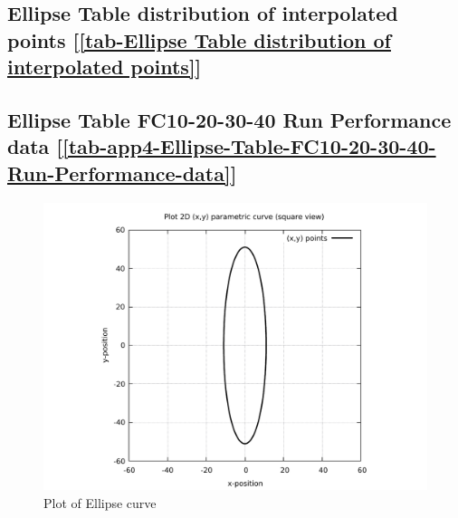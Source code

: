 \subsection    {Ellipse Table distribution of interpolated points
[\ref      {tab-Ellipse Table distribution of interpolated points}] }
\label{ssec-tab-Ellipse Table distribution of interpolated points}

\subsection         {Ellipse Table FC10-20-30-40 Run Performance data
[\ref      {tab-app4-Ellipse-Table-FC10-20-30-40-Run-Performance-data}] }
\label{ssec-tab-app4-Ellipse-Table-FC10-20-30-40-Run-Performance-data}


\clearpage
\pagebreak

\begin{figure}
	\caption     {Plot of Ellipse curve}
	\label{01-img-Plot of Ellipse curve.pdf}
	\includegraphics[width=1.00\textwidth]{Chap4/appendix/app-Ellipse/plots/01-img-Plot of Ellipse curve.pdf}
\end{figure}	


